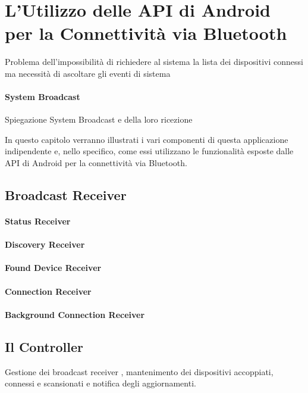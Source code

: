 \chapter{L'Utilizzo delle API di Android per la Connettività via Bluetooth}

Problema dell'impossibilità di richiedere al sistema la lista dei dispositivi connessi ma necessità di ascoltare gli eventi di sistema

\subsubsection{System Broadcast}
Spiegazione System Broadcast e della loro ricezione

In questo capitolo verranno illustrati i vari componenti di questa applicazione indipendente e, nello specifico, come essi utilizzano le funzionalità esposte dalle API di Android per la connettività via Bluetooth. 


\section{Broadcast Receiver}

\subsubsection{Status Receiver}

\subsubsection{Discovery Receiver}

\subsubsection{Found Device Receiver}

\subsubsection{Connection Receiver}

\subsubsection{Background Connection Receiver}


\section{Il Controller}
Gestione dei broadcast receiver , mantenimento dei dispositivi accoppiati, connessi e scansionati e notifica degli aggiornamenti.


